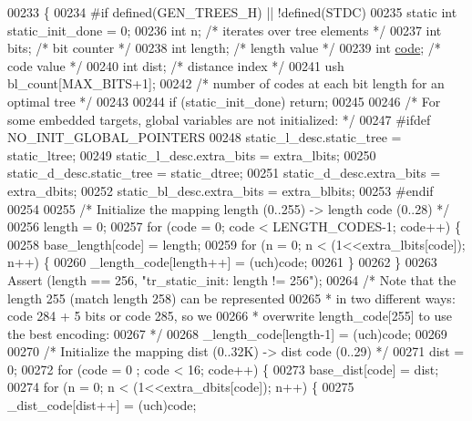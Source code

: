 \begin{DoxyCode}
{{00233 \{
00234 \textcolor{preprocessor}{#if defined(GEN\_TREES\_H) || !defined(STDC)}
00235     \textcolor{keyword}{static} \textcolor{keywordtype}{int} static\_init\_done = 0;
00236     \textcolor{keywordtype}{int} n;        \textcolor{comment}{/* iterates over tree elements */}
00237     \textcolor{keywordtype}{int} bits;     \textcolor{comment}{/* bit counter */}
00238     \textcolor{keywordtype}{int} length;   \textcolor{comment}{/* length value */}
00239     \textcolor{keywordtype}{int} \hyperlink{structcode}{code};     \textcolor{comment}{/* code value */}
00240     \textcolor{keywordtype}{int} dist;     \textcolor{comment}{/* distance index */}
00241     ush bl\_count[MAX\_BITS+1];
00242     \textcolor{comment}{/* number of codes at each bit length for an optimal tree */}
00243 
00244     \textcolor{keywordflow}{if} (static\_init\_done) \textcolor{keywordflow}{return};
00245 
00246     \textcolor{comment}{/* For some embedded targets, global variables are not initialized: */}
00247 \textcolor{preprocessor}{#ifdef NO\_INIT\_GLOBAL\_POINTERS}
00248     static\_l\_desc.static\_tree = static\_ltree;
00249     static\_l\_desc.extra\_bits = extra\_lbits;
00250     static\_d\_desc.static\_tree = static\_dtree;
00251     static\_d\_desc.extra\_bits = extra\_dbits;
00252     static\_bl\_desc.extra\_bits = extra\_blbits;
00253 \textcolor{preprocessor}{#endif}
00254 
00255     \textcolor{comment}{/* Initialize the mapping length (0..255) -> length code (0..28) */}
00256     length = 0;
00257     \textcolor{keywordflow}{for} (code = 0; code < LENGTH\_CODES-1; code++) \{
00258         base\_length[code] = length;
00259         \textcolor{keywordflow}{for} (n = 0; n < (1<<extra\_lbits[code]); n++) \{
00260             \_length\_code[length++] = (uch)code;
00261         \}
00262     \}
00263     Assert (length == 256, \textcolor{stringliteral}{"tr\_static\_init: length != 256"});
00264     \textcolor{comment}{/* Note that the length 255 (match length 258) can be represented}
00265 \textcolor{comment}{     * in two different ways: code 284 + 5 bits or code 285, so we}
00266 \textcolor{comment}{     * overwrite length\_code[255] to use the best encoding:}
00267 \textcolor{comment}{     */}
00268     \_length\_code[length-1] = (uch)code;
00269 
00270     \textcolor{comment}{/* Initialize the mapping dist (0..32K) -> dist code (0..29) */}
00271     dist = 0;
00272     \textcolor{keywordflow}{for} (code = 0 ; code < 16; code++) \{
00273         base\_dist[code] = dist;
00274         \textcolor{keywordflow}{for} (n = 0; n < (1<<extra\_dbits[code]); n++) \{
00275             \_dist\_code[dist++] = (uch)code;
}}
\end{DoxyCode}
